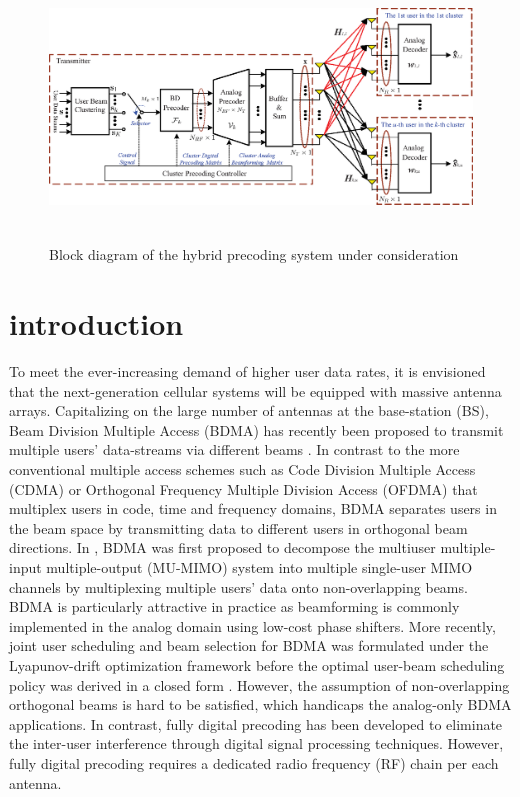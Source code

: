 \documentclass[conference]{IEEEtran}
\begin{document}
\begin{figure}[t]
\centering
\begin{minipage}[t]{0.7\linewidth}
	\includegraphics[height=2.8in,width=5.6in]{PPTFigure/BlockDiagonal.eps}
	\caption{Block diagram of the hybrid precoding system under consideration}\label{fig:BlockDiagram}
\end{minipage}
\end{figure}

\section{introduction}
To meet the ever-increasing demand of higher user data rates, it is envisioned that the next-generation cellular systems will be equipped with massive antenna arrays. Capitalizing on the large number of antennas at the base-station (BS), Beam Division Multiple Access (BDMA) has recently been proposed to transmit multiple users' data-streams via different beams \cite{sun2015beam, Jiang2018}. In contrast to the more conventional multiple access schemes such as Code Division Multiple Access (CDMA) or Orthogonal Frequency Multiple Division Access (OFDMA) that multiplex users in code, time and frequency domains, BDMA separates users in the beam space by transmitting data to different users in orthogonal beam directions. In \cite{sun2015beam}, BDMA was first proposed to decompose the multiuser multiple-input multiple-output (MU-MIMO) system into multiple single-user MIMO channels by multiplexing multiple users' data onto non-overlapping beams. BDMA is particularly attractive in practice as beamforming is commonly implemented in the analog domain using low-cost phase shifters. More recently, joint user scheduling and beam selection for BDMA was formulated under the Lyapunov-drift optimization framework before the optimal user-beam scheduling policy was derived in a closed form \cite{Jiang2018}. However, the assumption of non-overlapping orthogonal beams is hard to be satisfied, which handicaps the analog-only BDMA applications. In contrast, fully digital precoding has been developed to eliminate the inter-user interference through digital signal processing techniques. However, fully digital precoding requires a dedicated radio frequency (RF) chain per each antenna.
\end{document}
